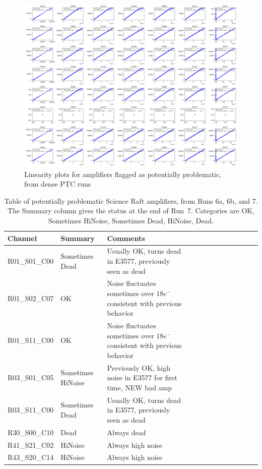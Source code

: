 \begin{figure}[ht]
    \centering
    \includegraphics[width=0.95\linewidth]{figures/lin_badamps.png}
    \caption{Linearity plots for amplifiers flagged as potentially problematic, from dense PTC runs}
    \label{fig:lin-badamps}
\end{figure}

\begin{table}[!ht]
    \tiny
    \centering
    \begin{tabular}{|l|l|l|l|l|l|l|l|l|l|l|l|l|}
    \hline
        Channel & Summary & Comments  \\ \hline

R01\_S01\_C00  & Sometimes Dead & Usually OK, turns dead in E3577, previously seen as dead \\ \hline
R01\_S02\_C07  & OK & Noise fluctuates sometimes over $18e^-$ consistent with previous behavior \\ \hline
R01\_S11\_C00  & OK & Noise fluctuates sometimes over $18e^-$ consistent with previous behavior \\ \hline
R03\_S01\_C05  & Sometimes HiNoise & Previously OK,  high noise in E3577 for first time, NEW bad amp \\ \hline
R03\_S11\_C00  & Sometimes Dead & Usually OK, turns dead in E3577, previously seen as dead \\ \hline
R30\_S00\_C10  & Dead & Always dead \\ \hline
R41\_S21\_C02  & HiNoise & Always high noise \\ \hline
R43\_S20\_C14  & HiNoise & Always high noise \\ \hline

    \end{tabular}
    \caption{Table of potentially problematic Science Raft amplifiers, from Runs 6a, 6b, and 7. The Summary column gives the status at the end of Run~7.  Categories are OK, Sometimes HiNoise, Sometimes Dead, HiNoise, Dead. \label{tab:gds_amps}}
\end{table}

